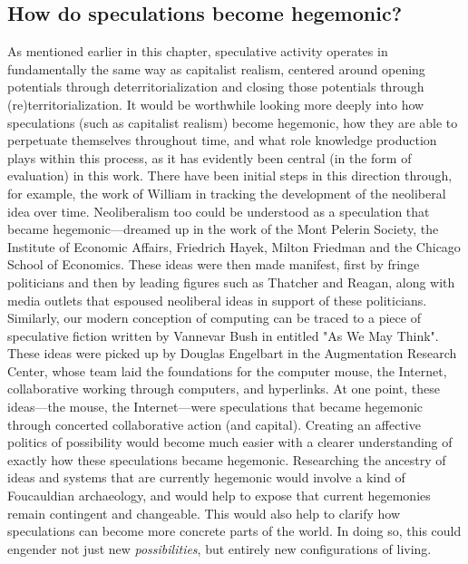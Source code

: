 \subsection{How do speculations become hegemonic?}
As mentioned earlier in this chapter, speculative activity operates in fundamentally the same way as capitalist realism, centered around opening potentials through deterritorialization and closing those potentials through (re)territorialization. It would be worthwhile looking more deeply into how speculations (such as capitalist realism) become hegemonic, how they are able to perpetuate themselves throughout time, and what role knowledge production plays within this process, as it has evidently been central (in the form of evaluation) in this work. There have been initial steps in this direction through, for example, the work of William \citet{connell_neoliberal_2013} in tracking the development of the neoliberal idea over time. Neoliberalism too could be understood as a speculation that became hegemonic—dreamed up in the work of the Mont Pelerin Society, the Institute of Economic Affairs, Friedrich Hayek, Milton Friedman and the Chicago School of Economics. These ideas were then made manifest, first by fringe politicians and then by leading figures such as Thatcher and Reagan, along with media outlets that espoused neoliberal ideas in support of these politicians. Similarly, our modern conception of computing can be traced to a piece of speculative fiction written by Vannevar Bush in \citeyear{bush_as_1945} entitled  "As We May Think". These ideas were picked up by Douglas Engelbart in the Augmentation Research Center, whose team laid the foundations for the computer mouse, the Internet, collaborative working through computers, and hyperlinks. At one point, these ideas—the mouse, the Internet—were speculations that became hegemonic through concerted collaborative action (and capital). Creating an affective politics of possibility would become much easier with a clearer understanding of exactly how these speculations became hegemonic. Researching the ancestry of ideas and systems that are currently hegemonic would involve a kind of Foucauldian archaeology, and would help to expose that current hegemonies remain contingent and changeable. This would also help to clarify how speculations can become more concrete parts of the world. In doing so, this could engender not just new \textit{possibilities}, but entirely new configurations of living.

